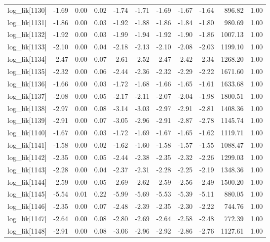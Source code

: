 \begin{table}[ht]
\begin{tabular}{rrrrrrrrrrr}
  log\_lik[1130] & -1.69 & 0.00 & 0.02 & -1.74 & -1.71 & -1.69 & -1.67 & -1.64 & 896.82 & 1.00 \\ 
  log\_lik[1131] & -1.86 & 0.00 & 0.03 & -1.92 & -1.88 & -1.86 & -1.84 & -1.80 & 980.69 & 1.00 \\ 
  log\_lik[1132] & -1.92 & 0.00 & 0.03 & -1.99 & -1.94 & -1.92 & -1.90 & -1.86 & 1007.13 & 1.00 \\ 
  log\_lik[1133] & -2.10 & 0.00 & 0.04 & -2.18 & -2.13 & -2.10 & -2.08 & -2.03 & 1199.10 & 1.00 \\ 
  log\_lik[1134] & -2.47 & 0.00 & 0.07 & -2.61 & -2.52 & -2.47 & -2.42 & -2.34 & 1268.20 & 1.00 \\ 
  log\_lik[1135] & -2.32 & 0.00 & 0.06 & -2.44 & -2.36 & -2.32 & -2.29 & -2.22 & 1671.60 & 1.00 \\ 
  log\_lik[1136] & -1.66 & 0.00 & 0.03 & -1.72 & -1.68 & -1.66 & -1.65 & -1.61 & 1633.68 & 1.00 \\ 
  log\_lik[1137] & -2.08 & 0.00 & 0.05 & -2.17 & -2.11 & -2.07 & -2.04 & -1.98 & 1800.51 & 1.00 \\ 
  log\_lik[1138] & -2.97 & 0.00 & 0.08 & -3.14 & -3.03 & -2.97 & -2.91 & -2.81 & 1408.36 & 1.00 \\ 
  log\_lik[1139] & -2.91 & 0.00 & 0.07 & -3.05 & -2.96 & -2.91 & -2.87 & -2.78 & 1145.74 & 1.00 \\ 
  log\_lik[1140] & -1.67 & 0.00 & 0.03 & -1.72 & -1.69 & -1.67 & -1.65 & -1.62 & 1119.71 & 1.00 \\ 
  log\_lik[1141] & -1.58 & 0.00 & 0.02 & -1.62 & -1.60 & -1.58 & -1.57 & -1.55 & 1088.47 & 1.00 \\ 
  log\_lik[1142] & -2.35 & 0.00 & 0.05 & -2.44 & -2.38 & -2.35 & -2.32 & -2.26 & 1299.03 & 1.00 \\ 
  log\_lik[1143] & -2.28 & 0.00 & 0.04 & -2.37 & -2.31 & -2.28 & -2.25 & -2.19 & 1348.36 & 1.00 \\ 
  log\_lik[1144] & -2.59 & 0.00 & 0.05 & -2.69 & -2.62 & -2.59 & -2.56 & -2.49 & 1500.20 & 1.00 \\ 
  log\_lik[1145] & -5.54 & 0.01 & 0.22 & -5.99 & -5.69 & -5.53 & -5.39 & -5.11 & 880.05 & 1.00 \\ 
  log\_lik[1146] & -2.35 & 0.00 & 0.07 & -2.48 & -2.39 & -2.35 & -2.30 & -2.22 & 744.76 & 1.00 \\ 
  log\_lik[1147] & -2.64 & 0.00 & 0.08 & -2.80 & -2.69 & -2.64 & -2.58 & -2.48 & 772.39 & 1.00 \\ 
  log\_lik[1148] & -2.91 & 0.00 & 0.08 & -3.06 & -2.96 & -2.92 & -2.86 & -2.76 & 1127.61 & 1.00 \\ 

\end{tabular}
\end{table}
